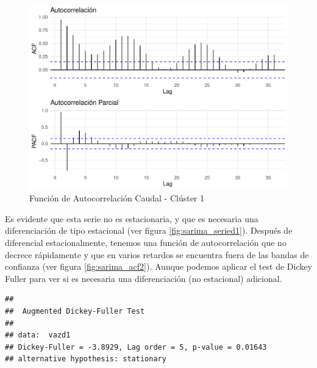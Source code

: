 \documentclass[12pt,oneside]{book}\usepackage[]{graphicx}\usepackage[]{color}
\makeatletter
\def\maxwidth{ %
  \ifdim\Gin@nat@width>\linewidth
    \linewidth
  \else
    \Gin@nat@width
  \fi
}
\newenvironment{kframe}{%
 \def\at@end@of@kframe{}%
 \ifinner\ifhmode%
  \def\at@end@of@kframe{\end{minipage}}%
  \begin{minipage}{\columnwidth}%
 \fi\fi%
 \def\FrameCommand##1{\hskip\@totalleftmargin \hskip-\fboxsep
 \colorbox{shadecolor}{##1}\hskip-\fboxsep
     \hskip-\linewidth \hskip-\@totalleftmargin \hskip\columnwidth}%
 \MakeFramed {\advance\hsize-\width
   \@totalleftmargin\z@ \linewidth\hsize
   \@setminipage}}%
 {\par\unskip\endMakeFramed%
 \at@end@of@kframe}
\newenvironment{knitrout}{}{} %
\theoremstyle{definition} %
\makeatother
\begin{document}
\begin{knitrout}
\color{fgcolor}\begin{figure}[H]

{\centering \includegraphics[width=\maxwidth]{figure/unnamed-chunk-8-1} 

}

\caption{\label{fig:sarima_acf} Función de Autocorrelación Caudal - Clúster 1}\label{fig:unnamed-chunk-8}
\end{figure}


\end{knitrout}







Es evidente que esta serie no es estacionaria, y que es necesaria una diferenciación de tipo estacional (ver figura \ref{fig:sarima_seried1}). Después de diferencial estacionalmente, tenemos una función de autocorrelación que no decrece rápidamente y que en varios retardos se encuentra fuera de las bandas de confianza (ver figura \ref{fig:sarima_acf2}). Aunque podemos aplicar el test de Dickey Fuller para ver si es necesaria una diferenciación (no estacional) adicional.


\begin{knitrout}
\color{fgcolor}\begin{kframe}
\begin{verbatim}
## 
## 	Augmented Dickey-Fuller Test
## 
## data:  vazd1
## Dickey-Fuller = -3.8929, Lag order = 5, p-value = 0.01643
## alternative hypothesis: stationary
\end{verbatim}
\end{kframe}
\end{knitrout}
\label{tab:dfuller}
\end{document}
